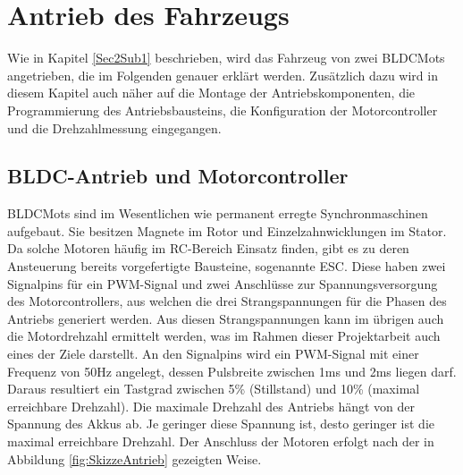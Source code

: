 

\pagestyle{fancy}
\rhead{\thepage} \chead{} 
\cfoot{}

\section{Antrieb des Fahrzeugs}\label{Sec4}

Wie in Kapitel \ref{Sec2Sub1} beschrieben, wird das Fahrzeug von zwei \acp{BLDCMot} angetrieben, die im Folgenden genauer erklärt werden. Zusätzlich dazu wird in diesem Kapitel auch näher auf die Montage der Antriebskomponenten, die Programmierung des Antriebsbausteins, die Konfiguration der Motorcontroller und die Drehzahlmessung eingegangen.

\subsection{BLDC-Antrieb und Motorcontroller}\label{Sec4Sub1}

\acp{BLDCMot} sind im Wesentlichen wie permanent erregte Synchronmaschinen aufgebaut. Sie besitzen Magnete im Rotor und Einzelzahnwicklungen im Stator. Da solche Motoren häufig im \ac{RC}-Bereich Einsatz finden, gibt es zu deren Ansteuerung bereits vorgefertigte Bausteine, sogenannte \ac{ESC}. Diese haben zwei Signalpins für ein \ac{PWM}-Signal und zwei Anschlüsse zur Spannungsversorgung des Motorcontrollers, aus welchen die drei Strangspannungen für die Phasen des Antriebs generiert werden. Aus diesen Strangspannungen kann im übrigen auch die Motordrehzahl ermittelt werden, was im Rahmen dieser Projektarbeit auch eines der Ziele darstellt. An den Signalpins wird ein \ac{PWM}-Signal mit einer Frequenz von 50Hz angelegt, dessen Pulsbreite zwischen 1ms und 2ms liegen darf. Daraus resultiert ein Tastgrad zwischen 5\% (Stillstand) und 10\% (maximal erreichbare Drehzahl). Die maximale Drehzahl des Antriebs hängt von der Spannung des Akkus ab. Je geringer diese Spannung ist, desto geringer ist die maximal erreichbare Drehzahl. Der Anschluss der Motoren erfolgt nach der in Abbildung \ref{fig:SkizzeAntrieb} gezeigten Weise.

